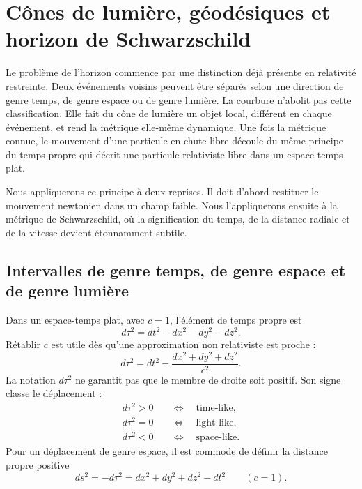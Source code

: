 \chapter{Cônes de lumière, géodésiques et horizon de Schwarzschild}

Le problème de l’horizon commence par une distinction déjà présente en relativité restreinte. Deux événements voisins peuvent être séparés selon une direction de genre temps, de genre espace ou de genre lumière. La courbure n’abolit pas cette classification. Elle fait du cône de lumière un objet local, différent en chaque événement, et rend la métrique elle-même dynamique. Une fois la métrique connue, le mouvement d’une particule en chute libre découle du même principe du temps propre qui décrit une particule relativiste libre dans un espace-temps plat.

Nous appliquerons ce principe à deux reprises. Il doit d’abord restituer le mouvement newtonien dans un champ faible. Nous l’appliquerons ensuite à la métrique de Schwarzschild, où la signification du temps, de la distance radiale et de la vitesse devient étonnamment subtile.

\section{Intervalles de genre temps, de genre espace et de genre lumière}

Dans un espace-temps plat, avec \(c=1\), l’élément de temps propre est
\begin{equation}
d\tau^2=dt^2-dx^2-dy^2-dz^2.
\label{eq:l5-minkowski-proper-time}
\end{equation}
Rétablir \(c\) est utile dès qu’une approximation non relativiste est proche :
\begin{equation}
d\tau^2
=dt^2-\frac{dx^2+dy^2+dz^2}{c^2}.
\label{eq:l5-minkowski-c}
\end{equation}
La notation \(d\tau^2\) ne garantit pas que le membre de droite soit positif. Son signe classe le déplacement :
\begin{align}
d\tau^2>0
&\quad\Longleftrightarrow\quad \text{time-like},\\
d\tau^2=0
&\quad\Longleftrightarrow\quad \text{light-like},\\
d\tau^2<0
&\quad\Longleftrightarrow\quad \text{space-like}.
\end{align}
Pour un déplacement de genre espace, il est commode de définir la distance propre positive
\begin{equation}
ds^2=-d\tau^2
=dx^2+dy^2+dz^2-dt^2
\qquad(c=1).
\label{eq:l5-proper-distance}
\end{equation}

